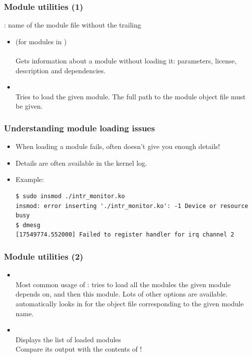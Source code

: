 \begin{frame}
  \frametitle{Module utilities (1)}
  : name of the module file without the trailing \\
  \begin{itemize}
  \item {} (for modules in )\\
    \\
    Gets information about a module without loading it: parameters, license,
    description and dependencies.\\
  \item {}\\
    Tries to load the given module. The full path to the module object
    file must be given.
  \end{itemize}
\end{frame}

\begin{frame}[fragile]
  \frametitle{Understanding module loading issues}
  \begin{itemize}
  \item When loading a module fails,  often doesn't give
    you enough details!
  \item Details are often available in the kernel log.
  \item Example:\\
\scriptsize
\begin{verbatim}
$ sudo insmod ./intr_monitor.ko
insmod: error inserting './intr_monitor.ko': -1 Device or resource busy
$ dmesg
[17549774.552000] Failed to register handler for irq channel 2
\end{verbatim}
  \end{itemize}
\end{frame}

\begin{frame}
  \frametitle{Module utilities (2)}
  \begin{itemize}
  \item {}\\
    Most common usage of : tries to load all the
    modules the given module depends on, and then this module. Lots of
    other options are available.  automatically looks in
     for the object file corresponding
    to the given module name.
  \item {}\\
    Displays the list of loaded modules\\
    Compare its output with the contents of !
  \end{itemize}
\end{frame}


